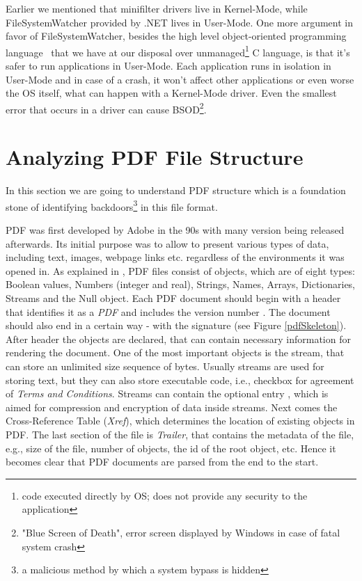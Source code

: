 Earlier we mentioned that minifilter drivers live in Kernel-Mode, while FileSystemWatcher provided by .NET lives in User-Mode. One more argument in favor of FileSystemWatcher, besides the high level object-oriented programming language \CSharp\ that we have at our disposal over unmanaged\footnote{code executed directly by OS; does not provide any security to the application} C language, is that it's safer to run applications in User-Mode. Each application runs in isolation in User-Mode and in case of a crash, it won't affect other applications or even worse the OS itself, what can happen with a Kernel-Mode driver. Even the smallest error that occurs in a driver can cause BSOD\footnote{"Blue Screen of Death", error screen displayed by Windows in case of fatal system crash}. 

\newpage
\section{Analyzing PDF File Structure}
\label{section:pdfStructure}
In this section we are going to understand PDF structure which is a foundation stone of identifying backdoors\footnote{a malicious method by which a system bypass is hidden} in this file format. \par
PDF was first developed by Adobe in the 90s with many version being released afterwards. Its initial purpose was to allow to present various types of data, including text, images, webpage links etc. regardless of the environments it was opened in. As explained in \cite{pdfReference}, PDF files consist of objects, which are of eight types: Boolean values, Numbers (integer and real), Strings, Names, Arrays, Dictionaries, Streams and the Null object. Each PDF document should begin with a header that identifies it as a \textit{PDF} and includes the version number . The document should also end in a certain way - with the signature  (see Figure \ref{pdfSkeleton}). After header the objects are declared, that can contain necessary information for rendering the document. One of the most important objects is the stream, that can store an unlimited size sequence of bytes. Usually streams are used for storing text, but they can also store executable code, i.e., checkbox for agreement of \textit{Terms and Conditions}. Streams can contain the optional entry , which is aimed for compression and encryption of data inside streams. Next comes the Cross-Reference Table (\textit{Xref}), which 
determines the location of existing objects in PDF. The last section of the file is \textit{Trailer}, that contains the metadata of the file, e.g., size of the file, number of objects, the id of the root object, etc. Hence it becomes clear that PDF documents are parsed from the end to the start.

